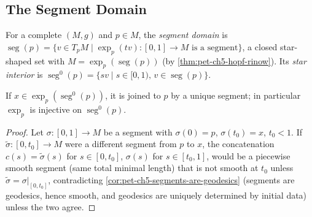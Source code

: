 \subsection{The Segment Domain}

\begin{definition}
  \label{def:pet-ch5-segment-domain}
  For a complete $(M,g)$ and $p\in M$, the \emph{segment domain} is
  $\operatorname{seg}(p)=\{v\in T_pM\mid\exp_p(tv):[0,1]\to M\text{ is a segment}\}$,
  a closed star-shaped set with $M=\exp_p(\operatorname{seg}(p))$ (by
  \cref{thm:pet-ch5-hopf-rinow}). Its \emph{star interior} is
  $\operatorname{seg}^0(p)=\{sv\mid s\in[0,1),\,v\in\operatorname{seg}(p)\}$.
\end{definition}

\begin{proposition}
  \label{prop:pet-ch5-segment-domain-injective}
  If $x\in\exp_p(\operatorname{seg}^0(p))$, it is joined to $p$ by a unique
  segment; in particular $\exp_p$ is injective on $\operatorname{seg}^0(p)$.
\end{proposition}
\begin{proof}
  Let $\sigma:[0,1]\to M$ be a segment with $\sigma(0)=p$, $\sigma(t_0)=x$,
  $t_0<1$. If $\tilde\sigma:[0,t_0]\to M$ were a different segment from $p$ to $x$,
  the concatenation $c(s)=\tilde\sigma(s)$ for $s\in[0,t_0]$, $\sigma(s)$ for
  $s\in[t_0,1]$, would be a piecewise smooth segment (same total minimal length)
  that is not smooth at $t_0$ unless $\tilde\sigma=\sigma|_{[0,t_0]}$, contradicting
  \cref{cor:pet-ch5-segments-are-geodesics} (segments are geodesics, hence smooth,
  and geodesics are uniquely determined by initial data) unless the two agree.
\end{proof}

